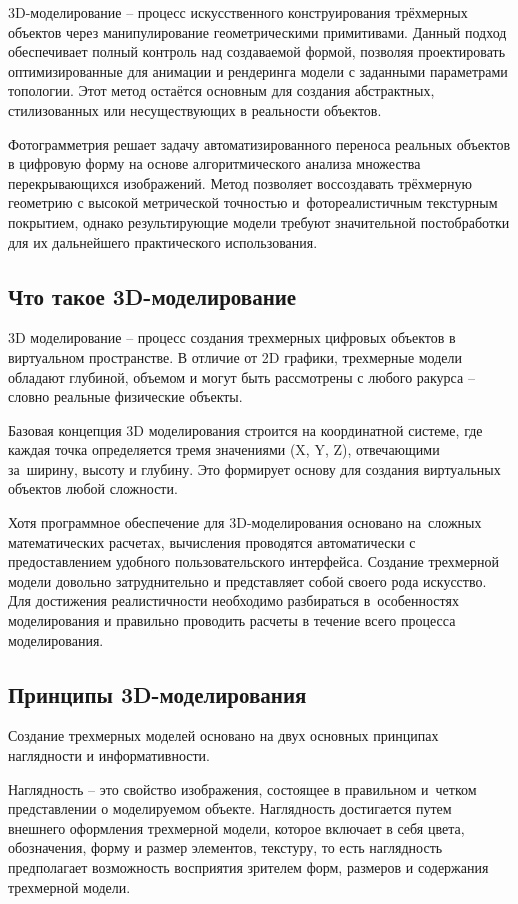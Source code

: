 \documentclass{ou}
\begin{document}
3D-моделирование -- процесс искусственного конструирования трёхмерных объектов через манипулирование геометрическими примитивами. Данный подход обеспечивает полный контроль над создаваемой формой, позволяя проектировать оптимизированные для анимации и рендеринга модели с заданными параметрами топологии. Этот метод остаётся основным для создания абстрактных, стилизованных или несуществующих в реальности объектов\cite{gb_3d}.

Фотограмметрия решает задачу автоматизированного переноса реальных объектов в цифровую форму на основе алгоритмического анализа множества перекрывающихся изображений. Метод позволяет воссоздавать трёхмерную геометрию с высокой метрической точностью и~фотореалистичным текстурным покрытием, однако результирующие модели требуют значительной постобработки для их дальнейшего практического использования\cite{sky_fotogrammetriya}.
\subsection{Что такое 3D-моделирование}
3D моделирование -- процесс создания трехмерных цифровых объектов в виртуальном пространстве. В отличие от 2D графики, трехмерные модели обладают глубиной, объемом и могут быть рассмотрены с любого ракурса -- словно реальные физические объекты\cite{sky_3d}.

Базовая концепция 3D моделирования строится на координатной системе, где каждая точка определяется тремя значениями (X, Y, Z), отвечающими за~ширину, высоту и глубину. Это формирует основу для создания виртуальных объектов любой сложности.

Хотя программное обеспечение для 3D-моделирования основано на~сложных математических расчетах, вычисления проводятся автоматически с предоставлением удобного пользовательского интерфейса. Создание трехмерной модели довольно затруднительно и представляет собой своего рода искусство. Для достижения реалистичности необходимо разбираться в~особенностях моделирования и правильно проводить расчеты в течение всего процесса моделирования.
\subsection{Принципы 3D-моделирования}
Создание трехмерных моделей основано на двух основных принципах наглядности и информативности.

Наглядность -- это свойство изображения, состоящее в правильном и~четком представлении о моделируемом объекте. Наглядность достигается путем внешнего оформления трехмерной модели, которое включает в себя цвета, обозначения, форму и размер элементов, текстуру, то есть наглядность предполагает возможность восприятия зрителем форм, размеров и содержания трехмерной модели.
\end{document}
